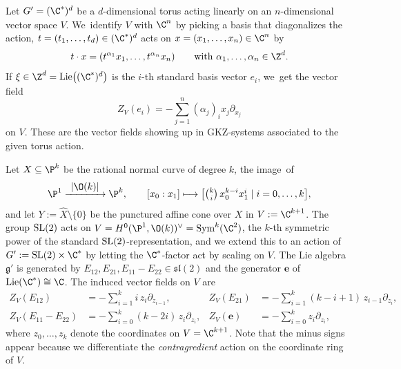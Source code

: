 \documentclass[JEP,XML,SOM,Unicode,published]{cedram}
\newcommand\mto{\mathchoice{\longmapsto}{\mapsto}{\mapsto}{\mapsto}}
\newcommand{\To}[1]{\mathchoice{\xrightarrow{\textstyle\kern4pt#1\kern3pt}}{\xrightarrow{\,#1\,}}{}{}}
\newcommand{\bme}{{\boldsymbol{e}}}
\newcommand{\frg}{\mathfrak{g}}
\newcommand{\fsl}{\mathfrak{sl}}
\DeclareMathOperator{\Lie}{\textup{Lie}}
\DeclareMathOperator{\SL}{\textup{SL}}
\DeclareMathOperator{\Sym}{\textup{Sym}}
\let\originalleft\left
\let\originalright\right
\renewcommand{\left}{\mathopen{}\mathclose\bgroup\originalleft}
\renewcommand{\right}{\aftergroup\egroup\originalright}
\begin{document}
\begin{exa}
Let $G' = (\C^*)^d$ be a $d$-dimensional torus acting linearly on an $n$\nobreakdash-dimen\-sion\-al vector space $V$. We~identify $V$ with $\C^n$ by picking a basis that diagonalizes the action, \ie $t = (t_1,\dots,t_d) \in (\C^*)^d$ acts on $x = (x_1,\dots,x_n) \in \C^n$ by
\[
t \cdot x = (t^{\alpha_1} x_1, \dots, t^{\alpha_n} x_n) \qquad \text{with }\alpha_1, \ldots, \alpha_n \in \Z^d.
\]
If $\xi \in \Z^d = \Lie\left((\C^*)^d\right)$ is the $i$-th standard basis vector $e_i$, we~get the vector field
\[
Z_V(e_i) = -\sum_{j=1}^n (\alpha_j)_i x_j \partial_{x_j}
\]
on $V$. These are the vector fields showing up in GKZ-systems associated to the given torus action.
\end{exa}

\begin{exa} \label{ex:P1VF}
Let $X \subseteq \P^k$ be the rational normal curve of degree $k$, \ie the image~of
\[
\P^1 \To{|\O(k)|} \P^k, \qquad [x_0:x_1] \mto \bigl[{\textstyle \binom{k}{i} \, x_0^{k-i} x_1^i \mid i = 0,\dots,k}\bigr],
\]
and let $Y := \hat X \setminus \{0\}$ be the punctured affine cone over $X$ in $V := \C^{k+1}$. The group $\SL(2)$ acts on $V = H^0(\P^1,\O(k))^\vee = \Sym^k (\C^2)$, the $k$-th symmetric power of the standard $\SL(2)$-representation, and we extend this to an action of $G' := \SL(2) \times \C^*$ by letting the $\C^*$-factor act by scaling on $V$.
The Lie algebra $\frg'$ is generated by $E_{12}, E_{21}, E_{11}-E_{22} \in \fsl(2)$ and the generator $\bme$ of $\Lie(\C^*) \cong \C$.
The induced vector fields on $V$ are
\begin{align*}
Z_V(E_{12}) &= -\sum_{i=1}^k i \, z_i \partial_{z_{i-1}},
&
Z_V(E_{21}) &= -\sum_{i=1}^k (k-i+1) \, z_{i-1} \partial_{z_i}, \\
Z_V(E_{11}-E_{22}) &= -\sum_{i=0}^k (k-2i) \, z_i \partial_{z_i},
&
Z_V(\bme) &= -\sum_{i=0}^k z_i \partial_{z_i},
\end{align*}
where $z_0,\dots,z_k$ denote the coordinates on $V = \C^{k+1}$. Note that the minus signs appear because we differentiate the \emph{contragredient} action on the coordinate ring of $V$.


\end{exa}
\end{document}
